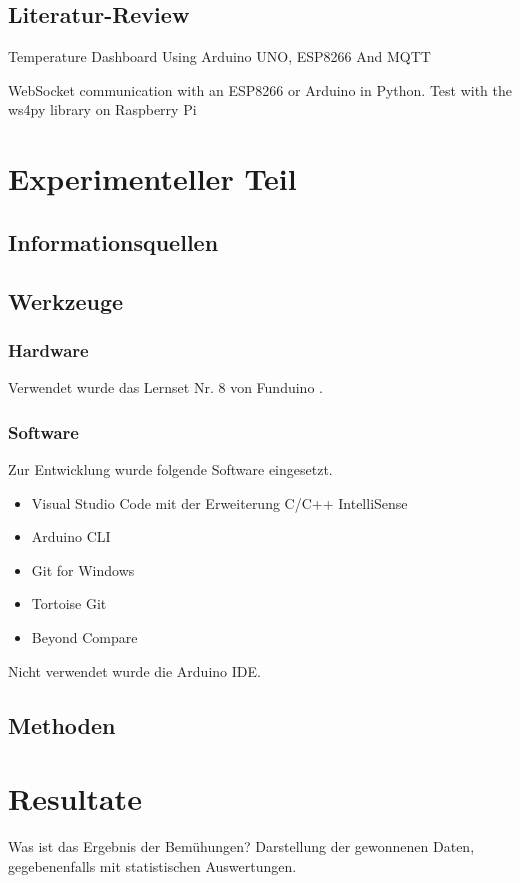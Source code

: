\subsection{Literatur-Review}
Temperature Dashboard Using Arduino UNO, ESP8266 And MQTT \cite{ESP8266}

WebSocket communication with an ESP8266 or Arduino in Python. Test with the ws4py library on Raspberry Pi
\cite{websocketcommunication}



\section{Experimenteller Teil}
\subsection{Informationsquellen}
\subsection{Werkzeuge}
\subsubsection{Hardware}
Verwendet wurde das Lernset Nr. 8 von Funduino \cite{lernset}.
\subsubsection{Software}
Zur Entwicklung wurde folgende Software eingesetzt.
\begin{itemize}
    \item Visual Studio Code \cite{vscode} mit der Erweiterung C/C++ IntelliSense \cite{intellisense}
    \item Arduino CLI \cite{arduinoCli}
    \item Git for Windows \cite{gitForWindows}
    \item Tortoise Git \cite{tortoiseGit} 
    \item Beyond Compare \cite{beyondCompare}
  \end{itemize}
Nicht verwendet wurde die Arduino IDE.
\subsection{Methoden}

\section{Resultate}
Was ist das Ergebnis der Bemühungen? Darstellung der gewonnenen Daten, gegebenenfalls mit statistischen Auswertungen.  

